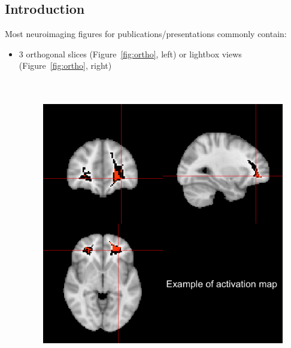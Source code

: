 \documentclass[final]{beamer}\usepackage[]{graphicx}\usepackage[]{color}
\title
{ %
Interactive 3 and 4D Images of High Resolution Neuroimage Data 
}
\author{ %
John Muschelli, Elizabeth Sweeney, Ciprian Crainiceanu
}
\institute
[Johns Hopkins Bloomberg School of Public Health] %
{
Johns Hopkins Bloomberg School of Public Health
}
\date{\today}
\begin{document}
\begin{frame}[fragile]
\begin{multicols}{2}

\section{Introduction}

Most neuroimaging figures for publications/presentations commonly contain:
\begin{itemize}
\item 3 orthogonal slices (Figure~\ref{fig:ortho}, left) or lightbox views (Figure~\ref{fig:ortho}, right)
\begin{figure}
  \begin{minipage}[b]{3.5in}
    \includegraphics[width=7in, height=5in]{./figure/ortho.png}
  \end{minipage}\hfill
  \begin{minipage}[b]{3.5in}

\end{minipage}
\end{figure}
\end{itemize}
\end{multicols}
\end{frame}
\end{document}
